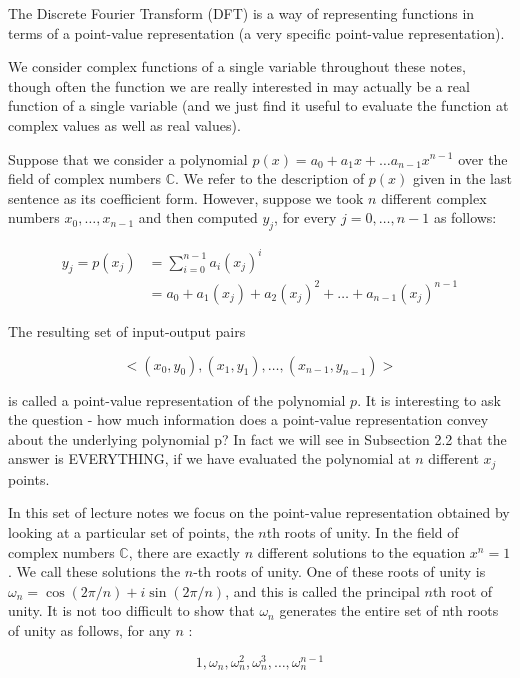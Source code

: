 The Discrete Fourier Transform (DFT) is a way of representing functions in terms of a point-value representation (a very specific point-value representation).

We consider complex functions of a single variable throughout these notes, though often the function we are really interested in may actually be a real function of a single variable (and we just find it useful to evaluate the function at complex values as well as real values).

Suppose that we consider a polynomial $p(x)=a_{0}+a_{1} x+\ldots a_{n-1} x^{n-1}$ over the field of complex numbers $\mathbb{C}$. We refer to the description of $p(x)$ given in the last sentence as its coefficient form. However, suppose we took $n$ different complex numbers $x_{0}, \ldots, x_{n-1}$ and then computed $y_{j}$, for every $j=0, \ldots, n-1$ as follows:

$$
\begin{aligned}
y_{j}=p\left(x_{j}\right) & =\sum_{i=0}^{n-1} a_{i}\left(x_{j}\right)^{i} \\
& =a_{0}+a_{1}\left(x_{j}\right)+a_{2}\left(x_{j}\right)^{2}+\ldots+a_{n-1}\left(x_{j}\right)^{n-1}
\end{aligned}
$$

The resulting set of input-output pairs

$$
<\left(x_{0}, y_{0}\right),\left(x_{1}, y_{1}\right), \ldots,\left(x_{n-1}, y_{n-1}\right)>
$$

is called a point-value representation of the polynomial $p$. It is interesting to ask the question - how much information does a point-value representation convey about the underlying polynomial p? In fact we will see in Subsection 2.2 that the answer is EVERYTHING, if we have evaluated the polynomial at $n$ different $x_{j}$ points.

In this set of lecture notes we focus on the point-value representation obtained by looking at a particular set of points, the $n$th roots of unity. In the field of complex numbers $\mathbb{C}$, there are exactly $n$ different solutions to the equation $x^{n}=1$. We call these solutions the $n$-th roots of unity. One of these roots of unity is $\omega_{n}=\cos (2 \pi / n)+i \sin (2 \pi / n)$, and this is called the principal $n$th root of unity. It is not too difficult to show that $\omega_{n}$ generates the entire set of nth roots of unity as follows, for any $n$ :

$$
1, \omega_{n}, \omega_{n}^{2}, \omega_{n}^{3}, \ldots, \omega_{n}^{n-1}
$$

